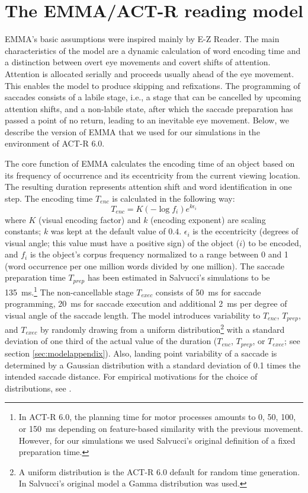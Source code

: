 \documentclass{cambridge7A}\usepackage[]{graphicx}\usepackage[]{color}
\begin{document}
\section{The EMMA/ACT-R reading model} \label{sec:emma}
EMMA's basic assumptions were inspired mainly by E-Z Reader. The main characteristics of the model are a dynamic calculation of word encoding time and a distinction between overt eye movements and covert shifts of attention. Attention is allocated serially and proceeds usually ahead of the eye movement. This enables the model to produce skipping and refixations. The programming of saccades consists of a labile stage, i.e., a stage that can be cancelled by upcoming attention shifts, and a non-labile state, after which the saccade preparation has passed a point of no return, leading to an inevitable eye movement. Below, we describe the version of EMMA that we used for our simulations in the environment of ACT-R 6.0.

The core function of EMMA calculates the encoding time of an object based on its frequency of occurrence and its eccentricity from the current viewing location. The resulting duration represents attention shift and word identification in one step. The encoding time $T_{enc}$ is calculated in the following way:
\begin{equation}
T_{enc} = K (- \log{f_i}) e^{k\epsilon_i}
\end{equation}
where $K$ (visual encoding factor) and $k$ (encoding exponent) are scaling constants; $k$ was kept at the default value of $0.4$. $\epsilon_i$ is the eccentricity (degrees of visual angle; this value must have a positive sign) of the object ($i$) to be encoded, and $f_i$ is the object's corpus frequency normalized to a range between 0 and 1 (word occurrence per one million words divided by one million). The saccade preparation time $T_{prep}$ has been estimated in Salvucci's simulations to be 135~ms.\footnote{In ACT-R 6.0, the planning time for motor processes amounts to 0, 50, 100, or 150~ms depending on feature-based similarity with the previous movement. However, for our simulations we used Salvucci's original definition of a fixed preparation time.} The non-cancellable stage $T_{exec}$ consists of 50~ms for saccade programming, 20~ms for saccade execution and additional 2~ms per degree of visual angle of the saccade length. The model introduces variability to $T_{enc}$, $T_{prep}$, and $T_{exec}$ by randomly drawing from a uniform distribution\footnote{A uniform distribution is the ACT-R 6.0 default for random time generation. In Salvucci's original model a Gamma distribution was used.} with a standard deviation of one third of the actual value of the  duration ($T_{enc}$, $T_{prep}$, or $T_{exec}$; see section \ref{sec:modelappendix}). Also, landing point variability of a saccade is determined by a Gaussian distribution with a standard deviation of 0.1 times the intended saccade distance. For empirical motivations for the choice of distributions, see \cite{Salvucci2001}.
\end{document}
